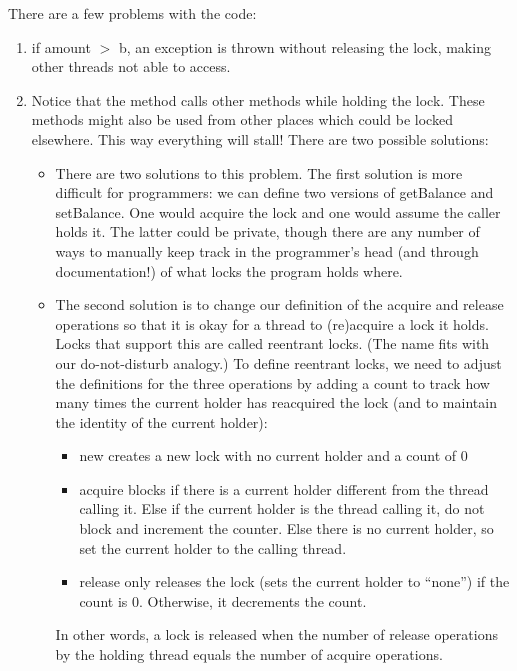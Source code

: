 \documentclass[letterpaper,12pt]{article}
\begin{document}
There are a few problems with the code:\begin{enumerate}
      \item if amount $>$ b, an exception is thrown without releasing the lock, making other threads not able to access.
      \item Notice that the method calls other methods while holding the lock. These methods might also be used from other places which could be locked elsewhere. This way everything will stall! There are two possible solutions:\begin{itemize}
            \item There are two solutions to this problem. The first solution is more difficult for programmers: we can define two versions of getBalance and setBalance. One would acquire the lock and one would assume the caller holds it. The latter could be private, though there are any number of ways to manually keep track in the programmer's head (and through documentation!) of what locks the program holds where.
            \item The second solution is to change our definition of the acquire and release operations so that it is okay for a thread to (re)acquire a lock it holds. Locks that support this are called reentrant locks. (The name fits with our do-not-disturb analogy.) To define reentrant locks, we need to adjust the definitions for the three operations by adding a count to track how many times the current holder has reacquired the lock (and to maintain the identity of the current holder):\begin{itemize}
                  \item new creates a new lock with no current holder and a count of 0
                  \item acquire blocks if there is a current holder different from the thread calling it. Else if the current holder is the thread calling it, do not block and increment the counter. Else there is no current holder, so set the current holder to the calling thread.
                  \item release only releases the lock (sets the current holder to ``none'') if the count is 0. Otherwise, it decrements the count.
            \end{itemize}
            In other words, a lock is released when the number of release operations by the holding thread equals the number of acquire operations.
      \end{itemize}
\end{enumerate}
\end{document}

